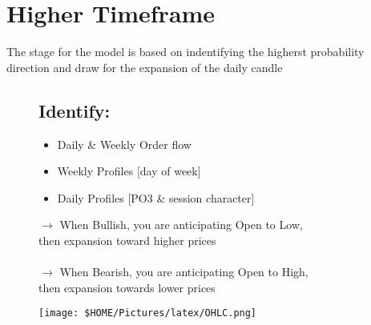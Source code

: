 \documentclass{article}
\begin{document}
\section{Higher Timeframe}
The stage for the model is based on indentifying the higherst probability direction and draw for the expansion of the daily candle

\vspace{0.6cm}


\begin{figure}[h]
\begin{minipage}{0.58\textwidth}
\subsection{Identify:}
  \vspace{0.3cm}
  \begin{itemize}
    \item Daily \& Weekly Order flow
    \item Weekly Profiles [day of week]
    \item Daily Profiles [PO3 \& session character]
  \end{itemize}
  \vspace{0.4cm}
$ \rightarrow $ When {\color[HTML]{008000}Bullish,} you are anticipating Open to Low, \\ then expansion toward higher prices \\\\
$ \rightarrow $ When {\color[HTML]{BB5153}Bearish,} you are anticipating Open to High, \\ then expansion towards lower prices

\end{minipage}
\hfill
\begin{minipage}{0.29\textwidth}
  \texttt{[image: \$HOME/Pictures/latex/OHLC.png]}
\end{minipage}
\end{figure}
\vspace{0.5cm}
\end{document}

